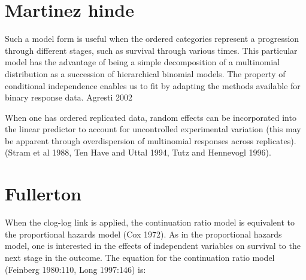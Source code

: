\section{Martinez hinde}

Such a model form is useful when the ordered categories represent a progression through different stages, such as survival through various times. This particular model has the advantage of being a simple decomposition of a multinomial distribution as a succession of hierarchical binomial models. The property of conditional independence enables us to fit by adapting the methods available for binary response data. Agresti 2002

When one has ordered replicated data, random effects can be incorporated into the linear predictor to account for uncontrolled experimental variation (this may be apparent through overdispersion of multinomial responses across replicates). (Stram et al 1988, Ten Have and Uttal 1994, Tutz and Hennevogl 1996).

\section{Fullerton}




When the clog-log link is applied, the continuation ratio model is equivalent to the proportional hazards model (Cox 1972). As in the proportional hazards model, one is interested in the effects of independent variables on survival to the next stage in the outcome. The equation for the continuation ratio model (Feinberg 1980:110, Long 1997:146) is:

